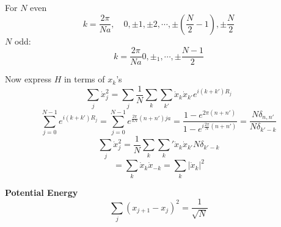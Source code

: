 \documentclass[11pt]{book}
\theoremstyle{definition}
\begin{document}
For $ N $ even
\[ k = \frac{2\pi}{Na}, \quad {0, \pm 1, \pm 2, \cdots, \pm (\frac{N}{2} - 1)}, \pm \frac{N}{2} \] 
$ N $ odd:
\[ k = \frac{2\pi}{Na} {0, \pm_1,\cdots, \pm{\frac{N-1}{2}} } \] 

Now express $ H $ in terms of $ x_k $'s
\[ \sum_j \dot x_j^2 = \sum_j \frac{1}{N}\sum_k \sum_{k'} \dot x_k \dot x_{k'} e^{i(k+k')R_j} \] 
\[ \sum_{j=0}^{N-1}  e^{i(k+k')R_j} 
= \sum_{j=0}^{N-1} e^{\frac{2\pi}{aN}(n+n')ja}
= \frac{1-e^{2\pi(n+n')}}{1 - e^{i\frac{2\pi}{N}(n+n')}}
= \frac{N\delta_{n,n'}}{N\delta_{k'-k}}\] 
\[ \sum_j \dot x_j^2 = \frac{1}{N} \sum_k \sum_k' \dot x_k \dot x_{k'}N \delta_{k'-k} \] 
\[ = \sum_k \dot x_k \dot x_{-k} = \sum_k |\dot x_k|^2\] 

\textbf{Potential Energy} 
\[ \sum_j(x_{j+1}-x_j)^2 = \frac{1}{\sqrt{N}} \] 
\end{document}
